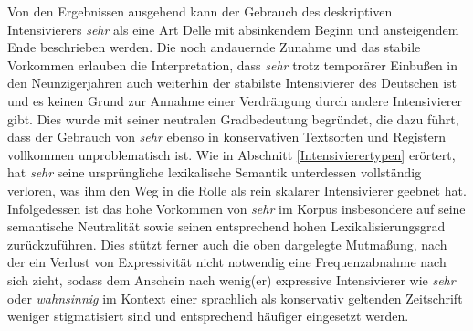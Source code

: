 \par Von den Ergebnissen ausgehend kann der Gebrauch des deskriptiven Intensivierers \textit{sehr} als eine Art Delle mit absinkendem Beginn und ansteigendem Ende beschrieben werden. Die noch andauernde Zunahme und das stabile Vorkommen erlauben die Interpretation, dass \textit{sehr} trotz temporärer Einbußen in den Neunzigerjahren auch weiterhin der stabilste Intensivierer des Deutschen ist und es keinen Grund zur Annahme einer Verdrängung durch andere Intensivierer gibt. Dies wurde mit seiner neutralen Gradbedeutung begründet, die dazu führt, dass der Gebrauch von \textit{sehr} ebenso in konservativen Textsorten und Registern vollkommen unproblematisch ist. Wie in Abschnitt \ref{Intensivierertypen} erörtert, hat \textit{sehr} seine ursprüngliche lexikalische Semantik unterdessen vollständig verloren, was ihm den Weg in die Rolle als rein skalarer Intensivierer geebnet hat. Infolgedessen ist das hohe Vorkommen von \textit{sehr} im Korpus insbesondere auf seine semantische Neutralität sowie seinen entsprechend hohen Lexikalisierungsgrad zurückzuführen. Dies stützt ferner auch die oben dargelegte Mutmaßung, nach der ein Verlust von Expressivität nicht notwendig eine Frequenzabnahme nach sich zieht, sodass dem Anschein nach wenig(er) expressive Intensivierer wie \textit{sehr} oder \textit{wahnsinnig} im Kontext einer sprachlich als konservativ geltenden Zeitschrift weniger stigmatisiert sind und entsprechend häufiger eingesetzt werden.

